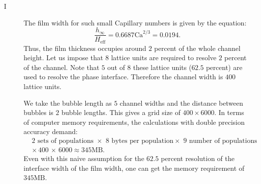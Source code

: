 \documentclass{article}
\newcommand{\Ca}{\mathrm{Ca}}
\begin{document}
\begin{description}
 \item[I ]
  The film width for such small Capillary numbers \cite{bretherton} is
given by the equation:
  \begin{equation}
  \frac{h_{\infty}}{H_{\mathrm{eff}}}=0.6687 \Ca^{2/3}=0.0194.
  \end{equation}
Thus, the film
thickness occupies around $2$ percent of the whole channel height. Let us impose that $8$ lattice
units are required to resolve  $2$ percent of the channel. Note that $5$ out of $8$ these lattice
units
($62.5$ percent) are used to resolve the phase interface. Therefore the channel width is $400$
lattice units.

We take the bubble length as $5$ channel widths
  and the distance between bubbles is $2$ bubble lengths. This gives a
grid size of $400 \times 6000$. In terms of computer memory
requirements, the calculations with double precision accuracy demand:
\begin{equation}
\begin{aligned}
&2\text{ sets of populations } \times \,\, 8\,\, \text{bytes per population
} \times \,\, 9 \text{ number of
populations}\\
&\times\,400\,\times\,6000\approx 345 \mathrm{MB}. 
\end{aligned}
\end{equation}
Even with this naive assumption for the $62.5$ percent resolution of the interface width of the film
width, one can get the memory
requirement of $345 \mathrm{MB}$. 


\end{description}
\end{document}
